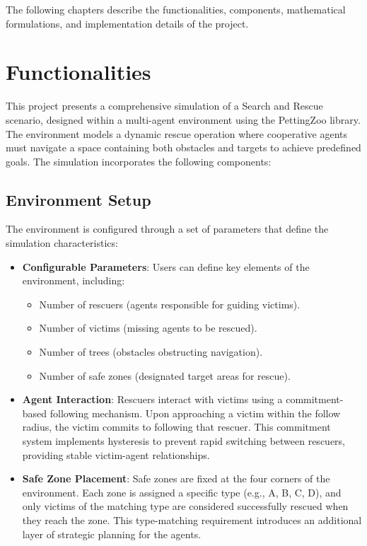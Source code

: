 \documentclass[11pt,a4paper]{article}
\begin{document}
The following chapters describe the functionalities, components, mathematical formulations, and implementation details of the project.

\section{Functionalities}
\label{sec:functionalities}

This project presents a comprehensive simulation of a Search and Rescue scenario, designed within a multi-agent environment using the PettingZoo library.
The environment models a dynamic rescue operation where cooperative agents must navigate a space containing both obstacles and targets to achieve predefined goals.
The simulation incorporates the following components:

\subsection{Environment Setup}
\label{subsec:env_setup}

The environment is configured through a set of parameters that define the simulation characteristics:

\begin{itemize}
    \item \textbf{Configurable Parameters}: Users can define key elements of the environment, including:
    \begin{itemize}
        \item Number of rescuers (agents responsible for guiding victims).
        \item Number of victims (missing agents to be rescued).
        \item Number of trees (obstacles obstructing navigation).
        \item Number of safe zones (designated target areas for rescue).
    \end{itemize}

    \item \textbf{Agent Interaction}: Rescuers interact with victims using a commitment-based following mechanism.
    Upon approaching a victim within the follow radius, the victim commits to following that rescuer.
    This commitment system implements hysteresis to prevent rapid switching between rescuers, providing stable victim-agent relationships.

    \item \textbf{Safe Zone Placement}: Safe zones are fixed at the four corners of the environment.
    Each zone is assigned a specific type (e.g., A, B, C, D), and only victims of the matching type are considered successfully rescued when they reach the zone.
    This type-matching requirement introduces an additional layer of strategic planning for the agents.
\end{itemize}
\end{document}
